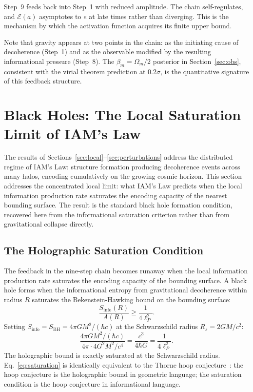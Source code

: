 \documentclass[12pt,a4paper]{article}
\begin{document}
Step~9 feeds back into Step~1 with reduced amplitude. The chain
self-regulates, and $\mathcal{E}(a)$ asymptotes to $e$ at late
times rather than diverging. This is the mechanism by which the
activation function acquires its finite upper bound.

Note that gravity appears at two points in the chain: as the
initiating cause of decoherence (Step~1) and as the observable
modified by the resulting informational pressure (Step~8). The
$\beta_m = \Omega_m/2$ posterior in Section~\ref{sec:obs},
consistent with the virial theorem prediction at $0.2\sigma$,
is the quantitative signature of this feedback structure.

\section{Black Holes: The Local Saturation Limit of IAM's Law}
\label{sec:bh}

The results of Sections~\ref{sec:local}--\ref{sec:perturbations}
address the distributed regime of IAM's Law: structure formation
producing decoherence events across many halos, encoding
cumulatively on the growing cosmic horizon. This section addresses
the concentrated local limit: what IAM's Law predicts when the
local information production rate saturates the encoding capacity
of the nearest bounding surface. The result is the standard black
hole formation condition, recovered here from the informational
saturation criterion rather than from gravitational collapse
directly.

\subsection{The Holographic Saturation Condition}

The feedback in the nine-step chain becomes runaway when the local
information production rate saturates the encoding capacity of the
bounding surface. A black hole forms when the informational entropy
from gravitational decoherence within radius $R$ saturates the
Bekenstein-Hawking bound on the bounding surface:
\begin{equation}
\frac{S_\mathrm{info}(R)}{A(R)} \geq \frac{1}{4\ell_P^2}.
\label{eq:saturation}
\end{equation}
Setting $S_\mathrm{info} = S_\mathrm{BH} = 4\pi GM^2/(\hbar c)$
at the Schwarzschild radius $R_s = 2GM/c^2$:
\begin{equation}
\frac{4\pi GM^2/(\hbar c)}{4\pi\cdot 4G^2M^2/c^4}
= \frac{c^3}{4\hbar G}
= \frac{1}{4\ell_P^2}.
\end{equation}
The holographic bound is exactly saturated at the Schwarzschild radius.
Eq.~\eqref{eq:saturation} is identically equivalent to the Thorne
hoop conjecture~\citep{Thorne1972}: the hoop conjecture is the
holographic bound in geometric language; the saturation condition is
the hoop conjecture in informational language.
\end{document}

